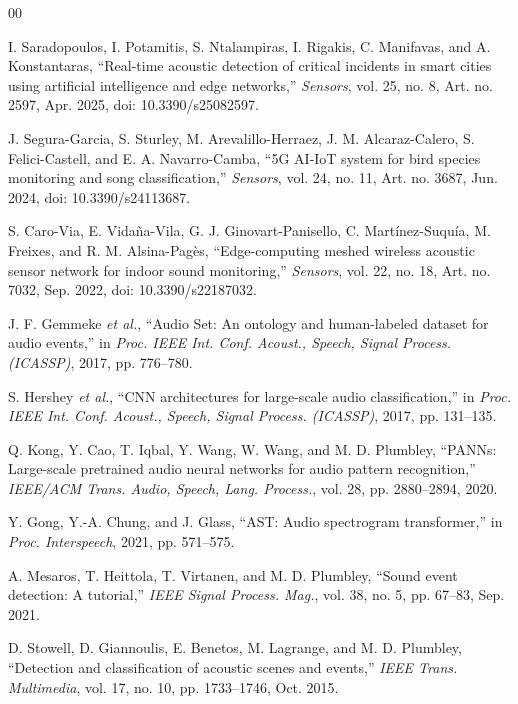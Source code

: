 \documentclass[conference]{IEEEtran}
\begin{document}
\begin{thebibliography}{00}

I. Saradopoulos, I. Potamitis, S. Ntalampiras, I. Rigakis, C. Manifavas, and A. Konstantaras, ``Real-time acoustic detection of critical incidents in smart cities using artificial intelligence and edge networks,'' \textit{Sensors}, vol. 25, no. 8, Art. no. 2597, Apr. 2025, doi: 10.3390/s25082597.

J. Segura-Garcia, S. Sturley, M. Arevalillo-Herraez, J. M. Alcaraz-Calero, S. Felici-Castell, and E. A. Navarro-Camba, ``5G AI-IoT system for bird species monitoring and song classification,'' \textit{Sensors}, vol. 24, no. 11, Art. no. 3687, Jun. 2024, doi: 10.3390/s24113687.

S. Caro-Via, E. Vida\~{n}a-Vila, G. J. Ginovart-Panisello, C. Mart\'{i}nez-Suqu\'{i}a, M. Freixes, and R. M. Alsina-Pag\`{e}s, ``Edge-computing meshed wireless acoustic sensor network for indoor sound monitoring,'' \textit{Sensors}, vol. 22, no. 18, Art. no. 7032, Sep. 2022, doi: 10.3390/s22187032.

J. F. Gemmeke \textit{et al.}, ``Audio Set: An ontology and human-labeled dataset for audio events,'' in \textit{Proc. IEEE Int. Conf. Acoust., Speech, Signal Process. (ICASSP)}, 2017, pp. 776--780.

S. Hershey \textit{et al.}, ``CNN architectures for large-scale audio classification,'' in \textit{Proc. IEEE Int. Conf. Acoust., Speech, Signal Process. (ICASSP)}, 2017, pp. 131--135.

Q. Kong, Y. Cao, T. Iqbal, Y. Wang, W. Wang, and M. D. Plumbley, ``PANNs: Large-scale pretrained audio neural networks for audio pattern recognition,'' \textit{IEEE/ACM Trans. Audio, Speech, Lang. Process.}, vol. 28, pp. 2880--2894, 2020.

Y. Gong, Y.-A. Chung, and J. Glass, ``AST: Audio spectrogram transformer,'' in \textit{Proc. Interspeech}, 2021, pp. 571--575.

A. Mesaros, T. Heittola, T. Virtanen, and M. D. Plumbley, ``Sound event detection: A tutorial,'' \textit{IEEE Signal Process. Mag.}, vol. 38, no. 5, pp. 67--83, Sep. 2021.

D. Stowell, D. Giannoulis, E. Benetos, M. Lagrange, and M. D. Plumbley, ``Detection and classification of acoustic scenes and events,'' \textit{IEEE Trans. Multimedia}, vol. 17, no. 10, pp. 1733--1746, Oct. 2015.


\end{thebibliography}
\end{document}
